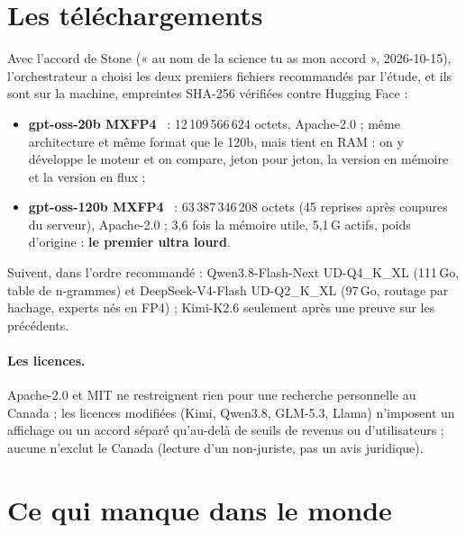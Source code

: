 \section{Les téléchargements}\label{sec:telechargements}

Avec l'accord de Stone (« au nom de la science tu as mon accord », 2026-10-15), l'orchestrateur a choisi les deux premiers fichiers recommandés par l'étude, et ils sont sur la machine, empreintes SHA-256 vérifiées contre Hugging Face :
\begin{itemize}
\item \textbf{gpt-oss-20b MXFP4}~\cite{hfgptoss20b} : 12\,109\,566\,624 octets, Apache-2.0 ; même architecture et même format que le 120b, mais tient en RAM : on y développe le moteur et on compare, jeton pour jeton, la version en mémoire et la version en flux ;
\item \textbf{gpt-oss-120b MXFP4}~\cite{hfgptoss120b} : 63\,387\,346\,208 octets (45 reprises après coupures du serveur), Apache-2.0 ; 3,6 fois la mémoire utile, 5,1\,G actifs, poids d'origine : \textbf{le premier ultra lourd}.
\end{itemize}
Suivent, dans l'ordre recommandé : Qwen3.8-Flash-Next UD-Q4\_K\_XL (111\,Go, table de n-grammes) et DeepSeek-V4-Flash UD-Q2\_K\_XL (97\,Go, routage par hachage, experts nés en FP4) ; Kimi-K2.6 seulement après une preuve sur les précédents.

\paragraph{Les licences.} Apache-2.0 et MIT ne restreignent rien pour une recherche personnelle au Canada ; les licences modifiées (Kimi, Qwen3.8, GLM-5.3, Llama) n'imposent un affichage ou un accord séparé qu'au-delà de seuils de revenus ou d'utilisateurs ; aucune n'exclut le Canada (lecture d'un non-juriste, pas un avis juridique).

\section{Ce qui manque dans le monde}

